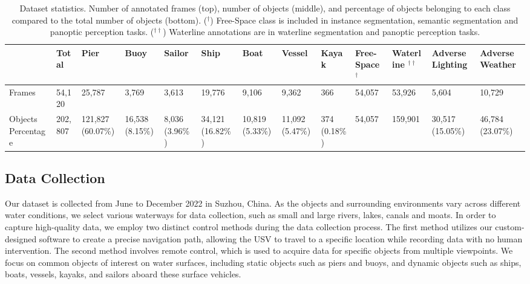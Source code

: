 \documentclass[lettersize,journal]{IEEEtran}
\begin{document}
\begin{table*}[!h]
\caption{Dataset statistics. Number of annotated frames (top), number of objects (middle), and percentage of objects belonging to each class compared to the total number of objects (bottom). ($^{\dagger}$) Free-Space class is included in instance segmentation, semantic segmentation and panoptic perception tasks. ($^{\dagger\dagger}$) Waterline annotations are in waterline segmentation and panoptic perception tasks.}
\setlength\tabcolsep{5pt} \center
\footnotesize
\begin{tabular*}{\linewidth}{p{1.3cm}<{}p{0.9cm}<{\centering}|p{0.9cm}<{\centering}p{0.9cm}<{\centering}p{0.9cm}<{\centering}p{0.9cm}<{\centering}p{0.9cm}<{\centering}p{0.9cm}<{\centering}p{0.9cm}<{\centering}|p{1.4cm}<{\centering}p{1.3cm}<{\centering}|p{1.1cm}<{\centering}p{1.1cm}<{\centering}}
\toprule

 & \bf{Total} & \bf{Pier} & \bf{Buoy} & \bf{Sailor} & \bf{Ship} & \bf{Boat} & \bf{Vessel} & \bf{Kayak} & \bf{Free-Space} $^{\dagger}$ & \bf{Waterline} $^{\dagger\dagger}$ & \bf{Adverse Lighting} & \bf{Adverse Weather} \\\midrule
Frames & 54,120 & 25,787 & 3,769 & 3,613 & 19,776 & 9,106 & 9,362 & 366 & 54,057 & 53,926 & 5,604 & 10,729  \\
Objects Percentage & 202,807 & 121,827 (60.07\%) & 16,538 (8.15\%) & 8,036 (3.96\%) & 34,121 (16.82\%) & 10,819 (5.33\%) & 11,092 (5.47\%) & 374 (0.18\%) & 54,057 & 159,901 & 30,517 (15.05\%) & 46,784 (23.07\%)    \\
\bottomrule
\end{tabular*}
\label{tab:waterscenes-statistics}
\end{table*}

\subsection{Data Collection}
Our dataset is collected from June to December 2022 in Suzhou, China. 
As the objects and surrounding environments vary across different water conditions, we select various waterways for data collection, such as small and large rivers, lakes, canals and moats.
In order to capture high-quality data, we employ two distinct control methods during the data collection process. 
The first method utilizes our custom-designed software to create a precise navigation path, allowing the USV to travel to a specific location while recording data with no human intervention. The second method involves remote control, which is used to acquire data for specific objects from multiple viewpoints.
We focus on common objects of interest on water surfaces, including static objects such as piers and buoys, and dynamic objects such as ships, boats, vessels, kayaks, and sailors aboard these surface vehicles.
\end{document}

